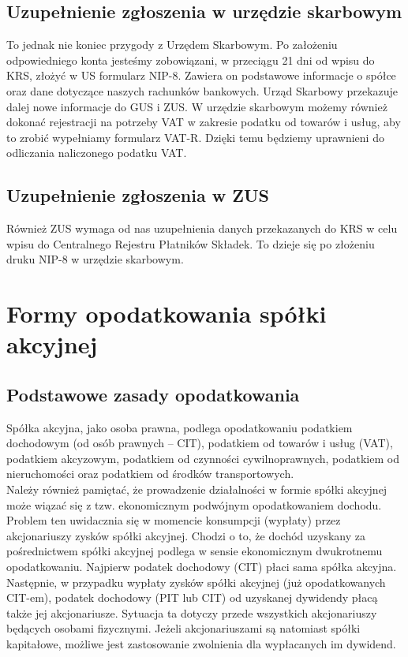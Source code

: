 \documentclass[11pt]{article}
\begin{document}
	\subsection{Uzupełnienie zgłoszenia w urzędzie skarbowym}


To jednak nie koniec przygody z Urzędem Skarbowym. Po założeniu odpowiedniego konta jesteśmy zobowiązani, w przeciągu 21 dni od wpisu do KRS, złożyć w US formularz NIP-8. Zawiera on podstawowe informacje o spółce oraz dane dotyczące naszych rachunków bankowych. Urząd Skarbowy przekazuje dalej nowe informacje do GUS i ZUS. W urzędzie skarbowym możemy również dokonać rejestracji na potrzeby VAT w zakresie podatku od towarów i usług, aby to zrobić wypełniamy formularz VAT-R. Dzięki temu będziemy uprawnieni do odliczania naliczonego podatku VAT.

\subsection{Uzupełnienie zgłoszenia w ZUS}


Również ZUS wymaga od nas uzupełnienia danych przekazanych do KRS w celu wpisu do Centralnego Rejestru Płatników Składek. To dzieje się po złożeniu druku NIP-8 w urzędzie skarbowym.




	
	\section{Formy opodatkowania spółki akcyjnej}
	
	\subsection{Podstawowe zasady opodatkowania}
	Spółka akcyjna, jako osoba prawna, podlega opodatkowaniu podatkiem dochodowym (od osób prawnych – CIT), podatkiem od towarów i usług (VAT), podatkiem akcyzowym, podatkiem od czynności cywilnoprawnych, podatkiem od nieruchomości oraz podatkiem od środków transportowych.\\
	Należy również pamiętać, że prowadzenie działalności w formie spółki akcyjnej może wiązać się z tzw. ekonomicznym podwójnym opodatkowaniem dochodu. Problem ten uwidacznia się w momencie konsumpcji (wypłaty) przez akcjonariuszy zysków spółki akcyjnej. Chodzi o to, że dochód uzyskany za pośrednictwem spółki akcyjnej podlega w sensie ekonomicznym dwukrotnemu opodatkowaniu. Najpierw podatek dochodowy (CIT) płaci sama spółka akcyjna. Następnie, w przypadku wypłaty zysków spółki akcyjnej (już opodatkowanych CIT-em), podatek dochodowy (PIT lub CIT) od uzyskanej dywidendy płacą także jej akcjonariusze. Sytuacja ta dotyczy przede wszystkich akcjonariuszy będących osobami fizycznymi. Jeżeli akcjonariuszami są natomiast spółki kapitałowe, możliwe jest zastosowanie zwolnienia dla wypłacanych im dywidend.
	
\end{document}
